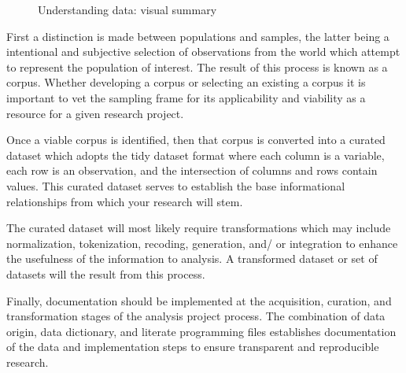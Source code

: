 \documentclass[
  letterpaper,
  DIV=11,
  numbers=noendperiod]{scrreprt}
\theoremstyle{definition}
\theoremstyle{remark}
\begin{document}
\begin{figure}[H]


\caption{\label{fig-understanding-data-vis-sum}Understanding data:
visual summary}

\end{figure}%

First a distinction is made between populations and samples, the latter
being a intentional and subjective selection of observations from the
world which attempt to represent the population of interest. The result
of this process is known as a corpus. Whether developing a corpus or
selecting an existing a corpus it is important to vet the sampling frame
for its applicability and viability as a resource for a given research
project.

Once a viable corpus is identified, then that corpus is converted into a
curated dataset which adopts the tidy dataset format where each column
is a variable, each row is an observation, and the intersection of
columns and rows contain values. This curated dataset serves to
establish the base informational relationships from which your research
will stem.

The curated dataset will most likely require transformations which may
include normalization, tokenization, recoding, generation, and/ or
integration to enhance the usefulness of the information to analysis. A
transformed dataset or set of datasets will the result from this
process.

Finally, documentation should be implemented at the acquisition,
curation, and transformation stages of the analysis project process. The
combination of data origin, data dictionary, and literate programming
files establishes documentation of the data and implementation steps to
ensure transparent and reproducible research.
\end{document}
